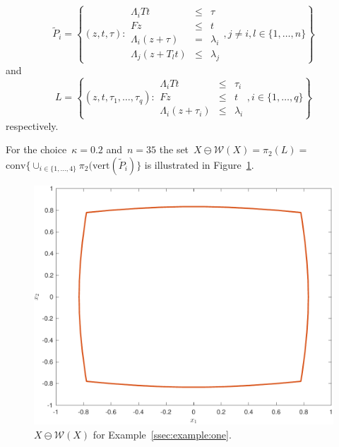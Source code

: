 \documentclass{elsarticle}
\providecommand{\conv}{\text{conv}}
\theoremstyle{remark}
\theoremstyle{definition}
\begin{document}
$$
\tilde P_i= \left\{(z,t,\tau): \begin{array}{rcl}\Lambda_i Tt &\leq& \tau\\ Fz&\leq& t\\ \Lambda_i(z+\tau)&=&\lambda_i\\ \Lambda_j(z+T_lt)&\leq&\lambda_j\end{array},j\neq i,l\in\{1,\dots,n\}\right\}
$$
%
and
$$
L = \left\{(z,t,\tau_1,\dots,\tau_q):\begin{array}{rcl}
\Lambda_i Tt & \leq &\tau_i\\
Fz &\leq& t\\
\Lambda_i(z+\tau_i)&\leq&\lambda_i
\end{array},i\in\{1,\dots,q\}\right\}
$$
%
respectively.

For the choice~$\kappa=0.2$ and~$n = 35$ the set~$X\ominus\mathcal W(X)=\pi_2(L)=$\linebreak $\conv\{\cup_{i\in\{1,\dots,4\}}\pi_2(\text{vert}(\tilde P_i)\}$ is illustrated in Figure~\ref{fig:example:parametric:pontryagin:difference}.

\begin{figure}
\centering
\includegraphics[width=.95\textwidth]{parametricPD.pdf}
\caption{$X\ominus\mathcal W(X)$ for Example~\ref{ssec:example:one}.}
\label{fig:example:parametric:pontryagin:difference}
\end{figure}
\end{document}
